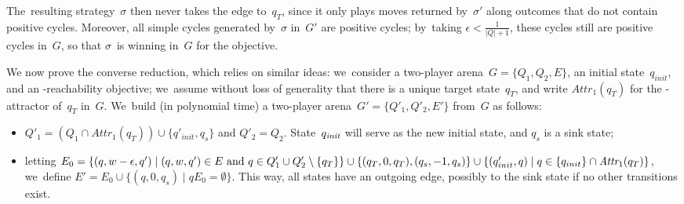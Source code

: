 The~resulting strategy~$\sigma$ then never takes the
edge to~$q_T$, since it only plays moves returned by~$\sigma'$ along
outcomes that do not contain positive cycles. Moreover, all simple
cycles generated by~$\sigma$ in~$G'$ are positive cycles; by~taking
$\epsilon<\frac 1{|Q|+1}$, these cycles still are positive cycles
in~$G$, so that $\sigma$~is winning in~$G$ for the \Lenergy objective.

\medskip

We now prove the converse reduction, which relies on similar ideas:
we~consider a two-player arena~$G=\{Q_1,Q_2,E\}$, an initial
state~$q_{init}$, and an \Lenergy-reachability objective; we~assume
without loss of generality that there is a unique target state~$q_T$, and write $Attr_{1}(q_T)$ for the -attractor of~$q_T$ in~$G$. We~build (in polynomial time) a two-player
arena~$G'=\{Q'_1,Q'_2,E'\}$ from~$G$ as follows:
\begin{itemize}
\item $Q'_1=(Q_1\cap Attr_1{(q_T)})\cup\{q'_{init}, q_s\}$ and $Q'_2=Q_2$.
  State~$q_{\textit{init}}$ will serve as the new initial state, and $q_s$ is a sink state;

\item letting $E_0=\{(q,w-\epsilon,q') \mid (q,w,q')\in E \text{ and }
  q\in Q'_1\cup Q'_2\setminus\{q_T\}\}
  \cup \{(q_T,0,q_T), (q_s,-1,q_s)\} \cup\{(q'_{init},q)\mid
  q\in \{q_{init}\}\cap \textit{Attr}_{1}(q_T)\}$, we~define
  $E'=E_0 \cup \{(q,0,q_s) \mid qE_0=\emptyset\}$. This way, all states
  have an outgoing edge, possibly to the sink state if no other
  transitions exist.
\end{itemize}

